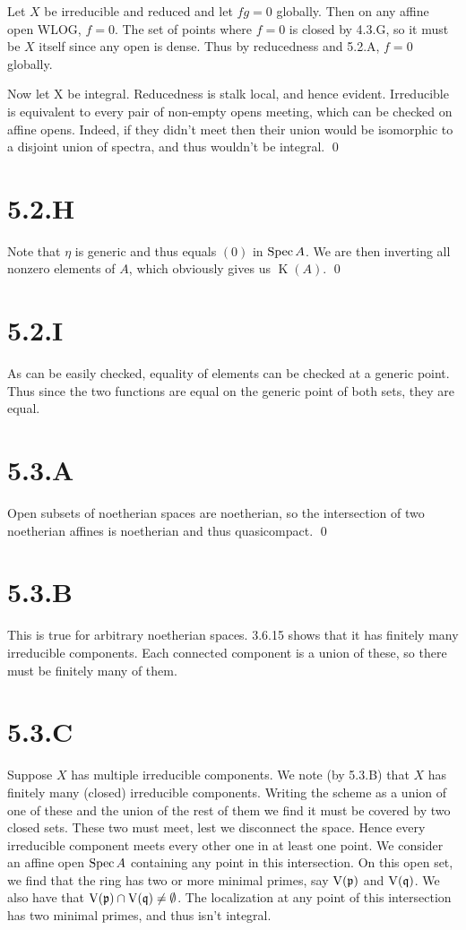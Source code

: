\documentclass{article}
\begin{document}
Let $X$ be irreducible and reduced and let
$fg=0$ globally. Then on any affine open WLOG,
$f=0$. The set of points where $f=0$ is
closed by 4.3.G, so it must be $X$ itself since any open is
dense. Thus by reducedness and 5.2.A, $f=0$ globally.

Now let X be integral. Reducedness is stalk local, and hence evident.
Irreducible is equivalent to every pair of non-empty opens meeting, which can
be checked on affine opens. Indeed, if they didn't meet then their union would
be isomorphic to a disjoint union of spectra, and thus wouldn't be integral.
\qed

\section{5.2.H}
Note that $\eta$ is generic and thus equals
$(0)$ in $\operatorname{Spec} A$. We are then inverting all
nonzero elements of $A$, which obviously gives us
$\operatorname{K}(A)$. \qed

\section{5.2.I}
As can be easily checked, equality of elements can be checked at a generic
point. Thus since the two functions are equal on the generic point of both
sets, they are equal.

\section{5.3.A}
Open subsets of noetherian spaces are noetherian, so the intersection of two
noetherian affines is noetherian and thus quasicompact. \qed

\section{5.3.B}
This is true for arbitrary noetherian spaces. 3.6.15 shows that it has finitely
many irreducible components. Each connected component is a union of these, so
there must be finitely many of them.

\section{5.3.C}
Suppose $X$ has multiple irreducible components. We note
(by 5.3.B) that $X$ has finitely many (closed) irreducible
components. Writing the scheme as a union of one of these and the union of the
rest of them we find it must be covered by two closed sets. These two must
meet, lest we disconnect the space. Hence every irreducible component meets
every other one in at least one point. We consider an affine open
$\operatorname{Spec} A$ containing any point in this intersection. On this open
set, we find that the ring has two or more minimal primes, say
$\operatorname{V}(\mathfrak{p})$ and $\operatorname{V}(\mathfrak{q})$. We also have that
$\operatorname{V}(\mathfrak{p}) \cap \operatorname{V}(\mathfrak{q})\neq \emptyset$. The localization at any point of this intersection has
two minimal primes, and thus isn't integral.
\end{document}
